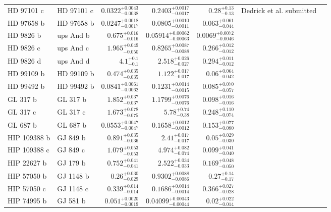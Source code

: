 \begin{longtable*}{llrrrrr}
HD 97101 c & HD 97101 c & $0.0322^{+0.0043}_{-0.0038}$ & $0.2403^{+0.0017}_{-0.0017}$ & $0.28^{+0.13}_{-0.13}$ & Dedrick et al. submitted & \\
HD 97658 b & HD 97658 b & $0.0247^{+0.0018}_{-0.0017}$ & $0.0805^{+0.0010}_{-0.0011}$ & $0.063^{+0.061}_{-0.044}$ & \cite{Howard11} & \\
HD 9826 b & ups And b & $0.675^{+0.016}_{-0.016}$ & $0.05914^{+0.00062}_{-0.00063}$ & $0.0069^{+0.0072}_{-0.0046}$ & \cite{Butler97} & \\
HD 9826 c & ups And c & $1.965^{+0.049}_{-0.050}$ & $0.8265^{+0.0087}_{-0.0088}$ & $0.266^{+0.012}_{-0.012}$ & \cite{Naef04} & \\
HD 9826 d & ups And d & $4.1^{+0.1}_{-0.1}$ & $2.518^{+0.026}_{-0.027}$ & $0.294^{+0.011}_{-0.012}$ & \cite{Naef04} & \\
HD 99109 b & HD 99109 b & $0.474^{+0.035}_{-0.035}$ & $1.122^{+0.017}_{-0.017}$ & $0.06^{+0.064}_{-0.042}$ & \cite{Butler06} & \\
HD 99492 b & HD 99492 b & $0.0841^{+0.0061}_{-0.0062}$ & $0.1231^{+0.0014}_{-0.0015}$ & $0.085^{+0.070}_{-0.057}$ & \cite{Marcy05} & \\
GL 317 b & GL 317 b & $1.852^{+0.037}_{-0.037}$ & $1.1799^{+0.0076}_{-0.0076}$ & $0.098^{+0.016}_{-0.016}$ & \cite{Johnson07b} & \\
GL 317 c & GL 317 c & $1.673^{+0.078}_{-0.075}$ & $5.78^{+0.74}_{-0.38}$ & $0.248^{+0.110}_{-0.074}$ & \cite{Anglada-Escude12} & \\
GL 687 b & GL 687 b & $0.0553^{+0.0047}_{-0.0047}$ & $0.1658^{+0.0012}_{-0.0012}$ & $0.153^{+0.077}_{-0.080}$ & \cite{Burt14} & \\
HIP 109388 b & GJ 849 b & $0.891^{+0.035}_{-0.036}$ & $2.41^{+0.017}_{-0.017}$ & $0.05^{+0.029}_{-0.030}$ & \cite{Butler06_GJ849} & \\
HIP 109388 c & GJ 849 c & $1.079^{+0.053}_{-0.053}$ & $4.974^{+0.082}_{-0.074}$ & $0.099^{+0.041}_{-0.040}$ & \cite{Feng15} & \\
HIP 22627 b & GJ 179 b & $0.752^{+0.041}_{-0.041}$ & $2.522^{+0.034}_{-0.033}$ & $0.169^{+0.048}_{-0.050}$ & \cite{Howard10} & \\
HIP 57050 b & GJ 1148 b & $0.26^{+0.030}_{-0.029}$ & $0.9302^{+0.0088}_{-0.0086}$ & $0.27^{+0.14}_{-0.17}$ & \cite{Haghighipour10} & \\
HIP 57050 c & GJ 1148 c & $0.339^{+0.014}_{-0.014}$ & $0.1686^{+0.0014}_{-0.0014}$ & $0.366^{+0.027}_{-0.028}$ & \cite{Trifonov17} & \\
HIP 74995 b & GJ 581 b & $0.051^{+0.0020}_{-0.0019}$ & $0.04099^{+0.00043}_{-0.00044}$ & $0.02^{+0.022}_{-0.014}$ & \cite{Bonfils05} & \\

\end{longtable*}
